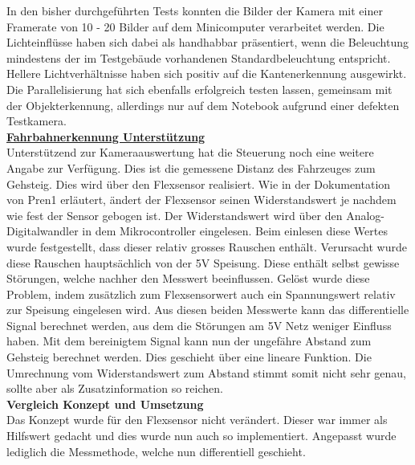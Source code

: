 In den bisher durchgeführten Tests konnten die Bilder der Kamera mit einer Framerate von 10 - 20 Bilder auf dem Minicomputer verarbeitet werden. Die Lichteinflüsse haben sich dabei als handhabbar präsentiert, wenn die Beleuchtung mindestens der im Testgebäude vorhandenen Standardbeleuchtung entspricht. Hellere Lichtverhältnisse haben sich positiv auf die Kantenerkennung ausgewirkt.\\
Die Parallelisierung hat sich ebenfalls erfolgreich testen lassen, gemeinsam mit der Objekterkennung, allerdings nur auf dem Notebook aufgrund einer defekten Testkamera.
\\[0.2cm]
\newpage
\underline{\textbf{Fahrbahnerkennung Unterstützung}}\\[0.2cm]
Unterstützend zur Kameraauswertung hat die Steuerung noch eine weitere Angabe zur Verfügung. Dies ist die gemessene Distanz des Fahrzeuges zum Gehsteig. Dies wird über den Flexsensor realisiert. Wie in der Dokumentation von Pren1 erläutert, ändert der Flexsensor seinen Widerstandswert je nachdem wie fest der Sensor gebogen ist. Der Widerstandswert wird über den Analog-Digitalwandler in dem Mikrocontroller eingelesen. Beim einlesen diese Wertes wurde festgestellt, dass dieser relativ grosses Rauschen enthält. Verursacht wurde diese Rauschen hauptsächlich von der 5V Speisung. Diese enthält selbst gewisse Störungen, welche nachher den Messwert beeinflussen. Gelöst wurde diese Problem, indem zusätzlich zum Flexsensorwert auch ein Spannungswert relativ zur Speisung eingelesen wird. Aus diesen beiden Messwerte kann das differentielle Signal berechnet werden, aus dem die Störungen am 5V Netz weniger Einfluss haben. Mit dem bereinigtem Signal kann nun der ungefähre Abstand zum Gehsteig berechnet werden. Dies geschieht über eine lineare Funktion. Die Umrechnung vom Widerstandswert zum Abstand stimmt somit nicht sehr genau, sollte aber als Zusatzinformation so reichen.%
\\[0.2cm]
\textbf{Vergleich Konzept und Umsetzung}\\[0.2cm]
Das Konzept wurde für den Flexsensor nicht verändert. Dieser war immer als Hilfswert gedacht und dies wurde nun auch so implementiert. Angepasst wurde lediglich die Messmethode, welche nun differentiell geschieht.